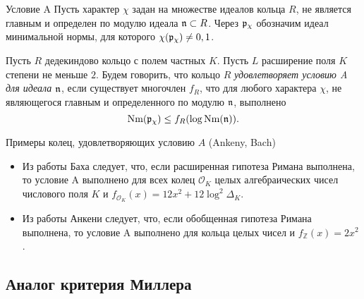 \documentclass[8pt, xcolor=x11names]{beamer}
\begin{document}
\begin{frame}
    \begin{block}{Условие A}
        Пусть характер $\chi$ задан на множестве идеалов кольца $R$, не является главным и определен по модулю идеала $\mathfrak{n} \subset R$.
        Через $\mathfrak{p}_{\chi}$ обозначим идеал минимальной нормы, для которого $\chi(\mathfrak{p}_{\chi}) \neq 0, 1$.
    
        Пусть $R$ дедекиндово кольцо с полем частных $K$.
        Пусть $L$ расширение поля $K$ степени не меньше $2$.
        Будем говорить, что кольцо $R$ \emph{удовлетворяет условию A для идеала $\mathfrak{n}$}, если существует многочлен $f_R$, что для любого характера $\chi$, не являющегося главным и определенного по модулю $\mathfrak{n}$, выполнено
        \begin{equation*}
            \textrm{Nm}(\mathfrak{p}_{\chi}) \le f_R(\log{\textrm{Nm}(\mathfrak{n})}).
        \end{equation*}
    \end{block}

    \begin{block}{Примеры колец, удовлетворяющих условию $A$ (Ankeny, Bach)}
        \begin{itemize}
            \item Из работы Баха следует, что, если расширенная гипотеза Римана выполнена, то условие A выполнено для всех колец $\mathcal{O}_K$ целых алгебраических чисел числового поля $K$ и $f_{\mathcal{O}_K}(x) = 12x^2 + 12\log^2 \Delta_{K}$.

            \item Из работы Анкени следует, что, если обобщенная гипотеза Римана выполнена, то условие A выполнено для кольца целых чисел и $f_{\mathbb{Z}}(x) = 2x^2$.
        \end{itemize}
    \end{block}
\end{frame}

\subsection{Аналог критерия Миллера}
\end{document}
